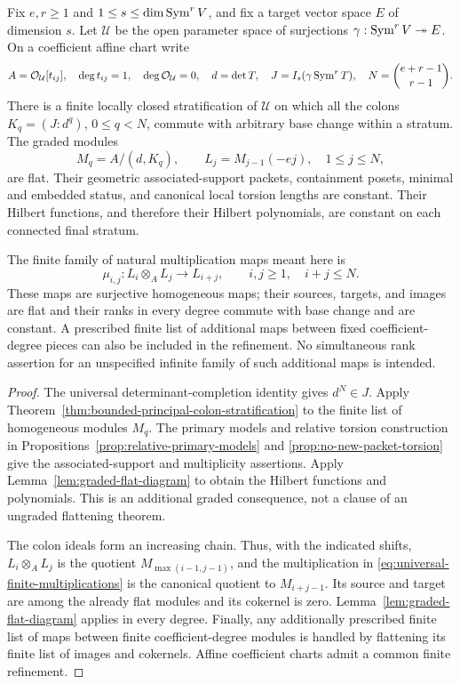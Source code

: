\begin{corollary}
\label{cor:universal-primary-finiteness}
Fix \(e,r\ge1\) and \(1\le s\le\dim\operatorname{Sym}^rV\), and fix a target
vector space \(E\) of dimension \(s\).  Let \(\mathcal U\) be the
open parameter space of surjections \(\gamma:\operatorname{Sym}^rV\twoheadrightarrow E\).
On a coefficient affine chart write
\[
 A=\mathcal O_{\mathcal U}[t_{ij}],\quad \deg t_{ij}=1,
 \quad\deg\mathcal O_{\mathcal U}=0,\quad d=\det T,
 \quad J=I_s(\gamma\operatorname{Sym}^rT),\quad N=\binom{e+r-1}{r-1}.
\]
There is a finite locally closed stratification of \(\mathcal U\)
on which all the colons \(K_q=(J:d^q)\), \(0\le q<N\), commute
with arbitrary base change within a stratum.  The graded modules
\[
 M_q=A/(d,K_q),\qquad L_j=M_{j-1}(-ej),\quad1\le j\le N,
\]
are flat.  Their geometric associated-support packets, containment
posets, minimal and embedded status, and canonical local torsion
lengths are constant.  Their Hilbert functions, and therefore their
Hilbert polynomials, are constant on each connected final stratum.

The finite family of natural multiplication maps meant here is
\begin{equation}\label{eq:universal-finite-multiplications}
 \mu_{i,j}:L_i\otimes_A L_j\longrightarrow L_{i+j},
 \qquad i,j\ge1,\quad i+j\le N.
\end{equation}
These maps are surjective homogeneous maps; their sources, targets,
and images are flat and their ranks in every degree commute with
base change and are constant.  A prescribed finite list of additional
maps between fixed coefficient-degree pieces can also be included
in the refinement.  No simultaneous rank assertion for an unspecified
infinite family of such additional maps is intended.
\end{corollary}
\begin{proof}
The universal determinant-completion identity gives \(d^N\in J\).
Apply Theorem~\ref{thm:bounded-principal-colon-stratification} to the
finite list of homogeneous modules \(M_q\).  The primary models and
relative torsion construction in
Propositions~\ref{prop:relative-primary-models} and
\ref{prop:no-new-packet-torsion} give the associated-support and
multiplicity assertions.  Apply Lemma~\ref{lem:graded-flat-diagram}
to obtain the Hilbert functions and polynomials.  This is an additional
graded consequence, not a clause of an ungraded flattening theorem.

The colon ideals form an increasing chain.  Thus, with the indicated
shifts, \(L_i\otimes_A L_j\) is the quotient
\(M_{\max(i-1,j-1)}\), and the multiplication in
\eqref{eq:universal-finite-multiplications} is the canonical quotient
to \(M_{i+j-1}\).  Its source and target are among the already flat
modules and its cokernel is zero.  Lemma~\ref{lem:graded-flat-diagram}
applies in every degree.  Finally, any additionally prescribed finite
list of maps between finite coefficient-degree modules is handled by
flattening its finite list of images and cokernels.  Affine coefficient
charts admit a common finite refinement.
\end{proof}

